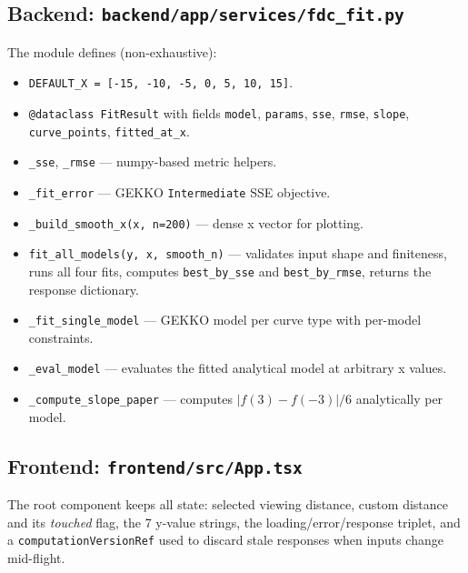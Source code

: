 \documentclass[11pt,a4paper]{article}
\begin{document}
\subsection{Backend: \texttt{backend/app/services/fdc\_fit.py}}
The module defines (non-exhaustive):
\begin{itemize}[leftmargin=1.2em]
  \item \texttt{DEFAULT\_X = [-15, -10, -5, 0, 5, 10, 15]}.
  \item \texttt{@dataclass FitResult} with fields \texttt{model},
        \texttt{params}, \texttt{sse}, \texttt{rmse}, \texttt{slope},
        \texttt{curve\_points}, \texttt{fitted\_at\_x}.
  \item \texttt{\_sse}, \texttt{\_rmse} --- numpy-based metric helpers.
  \item \texttt{\_fit\_error} --- GEKKO \texttt{Intermediate} SSE objective.
  \item \texttt{\_build\_smooth\_x(x, n=200)} --- dense x vector for plotting.
  \item \texttt{fit\_all\_models(y, x, smooth\_n)} --- validates input shape
        and finiteness, runs all four fits, computes \texttt{best\_by\_sse}
        and \texttt{best\_by\_rmse}, returns the response dictionary.
  \item \texttt{\_fit\_single\_model} --- GEKKO model per curve type with
        per-model constraints.
  \item \texttt{\_eval\_model} --- evaluates the fitted analytical model at
        arbitrary x values.
  \item \texttt{\_compute\_slope\_paper} --- computes $|f(3)-f(-3)|/6$
        analytically per model.
\end{itemize}

\subsection{Frontend: \texttt{frontend/src/App.tsx}}
The root component keeps all state: selected viewing distance, custom
distance and its \emph{touched} flag, the 7 y-value strings, the
loading/error/response triplet, and a \texttt{computationVersionRef} used to
discard stale responses when inputs change mid-flight.
\end{document}
